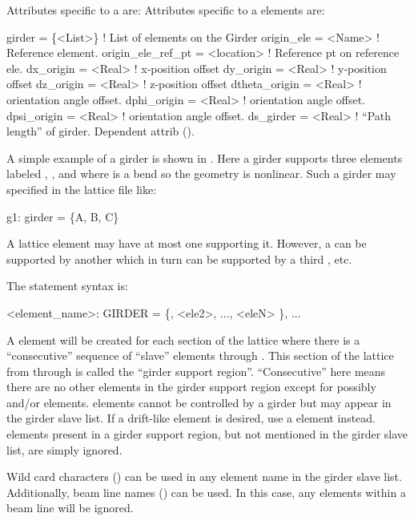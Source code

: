 Attributes specific to a  are:
Attributes specific to a  elements are:
\begin{example}
  girder = \{<List>\}   ! List of elements on the Girder
  origin_ele        = <Name>     ! Reference element.
  origin_ele_ref_pt = <location> ! Reference pt on reference ele.
  dx_origin         = <Real>     ! x-position offset
  dy_origin         = <Real>     ! y-position offset
  dz_origin         = <Real>     ! z-position offset
  dtheta_origin     = <Real>     ! orientation angle offset.
  dphi_origin       = <Real>     ! orientation angle offset.
  dpsi_origin       = <Real>     ! orientation angle offset.
  ds_girder         = <Real>     ! ``Path length'' of girder. Dependent attrib ().
\end{example}

A simple example of a girder is shown in . Here a girder
supports three elements labeled , , and  where
 is a bend so the geometry is nonlinear. Such a girder may
specified in the lattice file like:
\begin{example}
  g1: girder = \{A, B, C\}
\end{example}
A lattice element may have at most one  supporting it. However, 
a  can be supported by another  which in turn can
be supported by a third , etc.

The  statement syntax is:
\begin{example}
  <element_name>: GIRDER = \{<ele1>, <ele2>, ..., <eleN> \}, ...
\end{example}
A  element will be created for each section of the lattice
where there is a ``consecutive'' sequence of ``slave'' elements
 through .  This section of the lattice from
 through  is called the ``girder support
region''.  ``Consecutive'' here means there are no other elements in the
girder support region except for possibly  and/or 
elements.   elements cannot be controlled by a girder but may
appear in the girder slave list. If a drift-like element is
desired, use a  element instead.  elements present
in a girder support region, but not mentioned in the girder slave
list, are simply ignored.

Wild card characters () can be used in any element
name in the girder slave list. Additionally, beam line names
() can be used. In this case, any  elements
within a beam line will be ignored.

